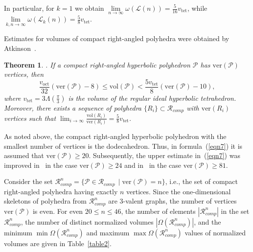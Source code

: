 \documentclass{amsart}
\newtheorem{theorem}{Theorem}[section]
\newcommand{\vol}{\mathrm{vol}}
\newcommand{\voct}{v_{\mathrm{oct}}}
\newcommand{\vtet}{v_{\mathrm{tet}}}
\newcommand{\ver}{\mathrm{ver}}
\begin{document}
In particular, for $k=1$ we obtain $\lim\limits_{n\to\infty} \omega(\mathcal L(n)) = \frac{5}{16}\vtet$, while $\lim\limits_{k,n\to\infty} \omega(\mathcal L_k(n)) = \frac{5}{8} \vtet$.
	
Estimates for volumes of compact right-angled polyhedra were obtained by Atkinson~\cite{At09}.

\begin{theorem} \cite[Theorem~2.3]{At09}.  \label{theorem3.2}
If a compact right-angled hyperbolic polyhedron $\mathcal P$ has $\ver(\mathcal P)$ vertices, then
\begin{equation} \label{eqn7}
\frac{\voct}{32}(\ver(\mathcal P)-8) \leq \vol(\mathcal P) < \frac{5\vtet}{8}(\ver(\mathcal P)-10),  
\end{equation}
where $\vtet = 3 \Lambda(\frac{\pi}{3})$ is the volume of the regular ideal hyperbolic tetrahedron. Moreover, there exists a sequence of polyhedra $\{R_i\} \subset \mathcal{R}_{comp}$ with $\ver(R_i)$ vertices such that $\lim_{i \to \infty} \frac{\vol(R_i)}{\ver(R_i)} = \frac{5}{8} \vtet$.
\end{theorem}
		
As noted above, the compact right-angled hyperbolic polyhedron with the smallest number of vertices is the dodecahedron. Thus, in formula~(\ref{eqn7}) it is assumed that $\ver(\mathcal P) \geq 20$. Subsequently, the upper estimate in~(\ref{eqn7}) was improved in~\cite{EV20-2} in the case $\ver(\mathcal P) \geq 24$ and in~\cite{ABEV} in the case $\ver(\mathcal P) \geq 81$.

Consider the set $\mathcal R^n_{comp} = \{ \mathcal P \in \mathcal R_{comp} \, \mid \ver(\mathcal P) = n\}$, i.e., the set of compact right-angled polyhedra having exactly $n$ vertices. Since the one-dimensional skeletons of polyhedra from $\mathcal R^n_{comp}$ are 3-valent graphs, the number of vertices $\ver(\mathcal P)$ is even. For even $20 \leq n \leq 46$, the number of elements $| \mathcal R^n_{comp}| $ in the set $\mathcal R^n_{comp}$, the number of distinct normalized volumes $|\Omega(\mathcal R^n_{comp})|$, and the minimum $\min \Omega(\mathcal R^n_{comp})$ and maximum $\max \Omega(\mathcal R^n_{comp})$ values of normalized volumes are given in Table~\ref{table2}.
\end{document}
